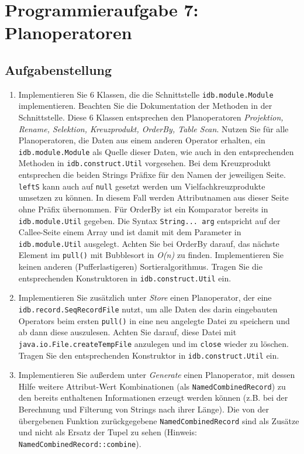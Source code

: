 \section{Programmieraufgabe 7: Planoperatoren}

\subsection{Aufgabenstellung}
\begin{enumerate}
	\item Implementieren Sie 6 Klassen, die die Schnittstelle \beamertxt{\linebreak}\texttt{idb.module.Module} implementieren.
		Beachten Sie die Dokumentation der Methoden in der Schnittstelle.
		Diese 6 Klassen entsprechen den Planoperatoren \textit{Projektion, Rename, Selektion, Kreuzprodukt, OrderBy, Table Scan}.
		Nutzen Sie für alle Planoperatoren, die Daten aus einem anderen Operator erhalten, ein \texttt{idb.module.Module} als Quelle dieser Daten, wie auch in den entsprechenden Methoden in \texttt{idb.construct.Util} vorgesehen.
		Bei dem Kreuzprodukt entsprechen die beiden Strings Präfixe für den Namen der jeweiligen Seite. \texttt{leftS} kann auch auf \texttt{null} gesetzt werden um Vielfachkreuzprodukte umsetzen zu können. In diesem Fall werden Attributnamen aus dieser Seite ohne Präfix übernommen.
		Für OrderBy ist ein Komparator bereits in \texttt{idb.module.Util} gegeben. Die Syntax \texttt{String... arg} entspricht auf der Callee-Seite einem Array und ist damit mit dem Parameter in \texttt{idb.module.Util} ausgelegt.
		Achten Sie bei OrderBy darauf, das nächste Element im \texttt{pull()} mit Bubblesort in \textit{O(n)} zu finden.
		Implementieren Sie keinen anderen (Pufferlastigeren) Sortieralgorithmus.
		Tragen Sie die entsprechenden Konstruktoren in \texttt{idb.construct.Util} ein.
	\item Implementieren Sie zusätzlich unter \textit{Store} einen Planoperator, der eine \linebreak \texttt{idb.record.SeqRecordFile} nutzt, um alle Daten des darin eingebauten Operators beim ersten \texttt{pull()} in eine neu angelegte Datei zu speichern und ab dann diese auszulesen. Achten Sie darauf, diese Datei mit \texttt{java.io.File.createTempFile} anzulegen und im \texttt{close} wieder zu löschen.
		Tragen Sie den entsprechenden Konstruktor in \texttt{idb.construct.Util} ein.
	\item Implementieren Sie außerdem unter \textit{Generate} einen Planoperator, mit dessen Hilfe weitere Attribut-Wert Kombinationen (als \texttt{NamedCombinedRecord}) zu den bereits enthaltenen Informationen erzeugt werden können (z.B. bei der Berechnung und Filterung von Strings nach ihrer Länge). Die von der übergebenen Funktion zurückgegebene \texttt{NamedCombinedRecord} sind als Zusätze und nicht als Ersatz der Tupel zu sehen (Hinweis: \texttt{NamedCombinedRecord::combine}).

\end{enumerate}
